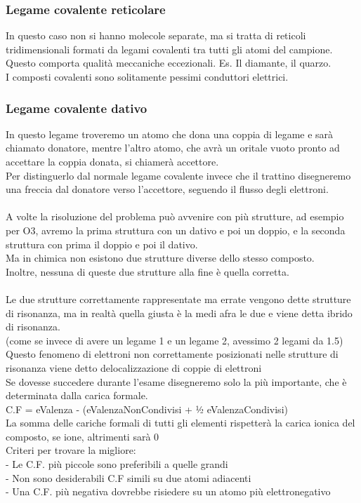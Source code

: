 \subsubsection{Legame covalente reticolare}
In questo caso non si hanno molecole separate, ma si tratta di reticoli tridimensionali formati da legami covalenti tra tutti gli atomi del campione. Questo comporta qualità meccaniche eccezionali. Es. Il diamante, il quarzo.\\
I composti covalenti sono solitamente pessimi conduttori elettrici.
\subsubsection{Legame covalente dativo}
In questo legame troveremo un atomo che dona una coppia di legame e sarà chiamato donatore, mentre l'altro atomo, che avrà un oritale vuoto pronto ad accettare la coppia donata, si chiamerà accettore.\\
Per distinguerlo dal normale legame covalente invece che il trattino disegneremo una freccia dal donatore verso l’accettore, seguendo il flusso degli elettroni.\\\\
A volte la risoluzione del problema può avvenire con più strutture, ad esempio per O3, avremo la prima struttura con un dativo e poi un doppio, e la seconda struttura con prima il doppio e poi il dativo.\\
Ma in chimica non esistono due strutture diverse dello stesso composto.\\
Inoltre, nessuna di queste due strutture alla fine è quella corretta. \\\\
Le due strutture correttamente rappresentate ma errate vengono dette  strutture di risonanza, ma in realtà quella giusta è la medi afra le due e viene detta ibrido di risonanza. \\
(come se invece di avere un legame 1 e un legame 2, avessimo 2 legami da 1.5)\\
Questo fenomeno di elettroni non correttamente posizionati nelle strutture di risonanza viene detto delocalizzazione di coppie di elettroni\\
Se dovesse succedere durante l’esame disegneremo solo la più importante, che è determinata dalla carica formale.\\
C.F = eValenza - (eValenzaNonCondivisi + ½ eValenzaCondivisi)\\
La somma delle cariche formali di tutti gli elementi rispetterà la carica ionica del composto, se ione, altrimenti sarà 0\\
Criteri per trovare la migliore:\\
\tab- Le C.F. più piccole sono preferibili a quelle grandi\\
\tab- Non sono desiderabili C.F simili su due atomi adiacenti\\
\tab- Una C.F. più negativa dovrebbe risiedere su un atomo più elettronegativo

